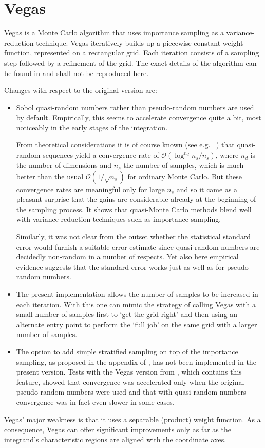 \documentclass[12pt]{article}
\newcommand\eg{e.g.\ }
\newcommand\order{\mathcal{O}}
\begin{document}
\section{Vegas}

Vegas is a Monte Carlo algorithm that uses importance sampling as a
variance-reduction technique.  Vegas iteratively builds up a
piecewise constant weight function, represented on a rectangular grid. 
Each iteration consists of a sampling step followed by a refinement of
the grid.  The exact details of the algorithm can be found in
\cite{Vegas1,Vegas2} and shall not be reproduced here.

Changes with respect to the original version are:
\begin{itemize}
\item
Sobol quasi-random numbers \cite{Sobol} rather than pseudo-random
numbers are used by default.  Empirically, this seems to accelerate
convergence quite a bit, most noticeably in the early stages of the
integration.

From theoretical considerations it is of course known (see \eg
\cite{Niederreiter}) that quasi-random sequences yield a convergence
rate of $\order(\log^{n_d} n_s/n_s)$, where $n_d$ is the number of
dimensions and $n_s$ the number of samples, which is much better than
the usual $\order(1/\sqrt{n_s})$ for ordinary Monte Carlo.  But these
convergence rates are meaningful only for large $n_s$ and so it came as
a pleasant surprise that the gains are considerable already at the
beginning of the sampling process.  It shows that quasi-Monte Carlo
methods blend well with variance-reduction techniques such as importance
sampling.

Similarly, it was not clear from the outset whether the statistical
standard error would furnish a suitable error estimate since
quasi-random numbers are decidedly non-random in a number of respects. 
Yet also here empirical evidence suggests that the standard error works
just as well as for pseudo-random numbers.

\item
The present implementation allows the number of samples to be increased
in each iteration.  With this one can mimic the strategy of calling
Vegas with a small number of samples first to `get the grid right' and
then using an alternate entry point to perform the `full job' on the
same grid with a larger number of samples.

\item
The option to add simple stratified sampling on top of the importance
sampling, as proposed in the appendix of \cite{Vegas1}, has not been
implemented in the present version.  Tests with the Vegas version from
\cite{NumRecipes}, which contains this feature, showed that convergence
was accelerated only when the original pseudo-random numbers were used
and that with quasi-random numbers convergence was in fact even slower 
in some cases.
\end{itemize}
Vegas' major weakness is that it uses a separable (product) weight
function.  As a consequence, Vegas can offer significant improvements
only as far as the integrand's characteristic regions are aligned with
the coordinate axes.
\end{document}
